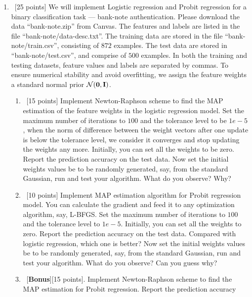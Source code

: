 \documentclass[12pt, fullpage,letterpaper]{article}
\begin{document}
\begin{enumerate}
	\item~[25 points] We will implement  Logistic regression and Probit regression for a binary classification task --- bank-note authentication. Please download the data ``bank-note.zip'' from Canvas. The features and labels are listed in the file ``bank-note/data-desc.txt''. The training data are stored in the file ``bank-note/train.csv'', consisting of $872$ examples. The test data are stored in ``bank-note/test.csv'', and comprise of $500$ examples. In both the training and testing datasets, feature values and labels are separated by commas. To ensure numerical stability and avoid overfitting, we assign the feature weights a standard normal prior $\mathcal{N}({\bf 0}, {\bf I})$.  
	\begin{enumerate}

	\item~[15 points] Implement Newton-Raphson scheme to find the MAP estimation of the feature weights in the logistic regression model. Set the maximum number of iterations to $100$ and the tolerance level to be $1e-5$,  \ie when the norm of difference between the weight vectors after one update is below the tolerance level, we consider it converges and stop updating the weights any more. Initially, you can set all the weights to be zero. Report the prediction accuracy on the test data. Now set the initial weights values be to be randomly generated, say, from the standard Gaussian, run and test your algorithm. What do you observe? Why? 
	\item~[10 points]  Implement MAP estimation algorithm for Probit regression model. You can calculate the gradient and feed it to any optimization algorithm, say, L-BFGS. Set the maximum number of iterations to $100$ and the tolerance level to $1e-5$. Initially, you can set all the weights to zero. Report the prediction accuracy  on the test data. Compared with logistic regression, which one is better? 
	Now set the initial weights values be to be randomly generated, say, from the standard Gaussian, run and test your algorithm. What do you observe? Can you guess why? 
	\item~[\textbf{Bonus}][15 points]. Implement Newton-Raphson scheme to find the MAP estimation for Probit regression. Report the prediction accuracy 

	
\end{enumerate}


\end{enumerate}
\end{document}
